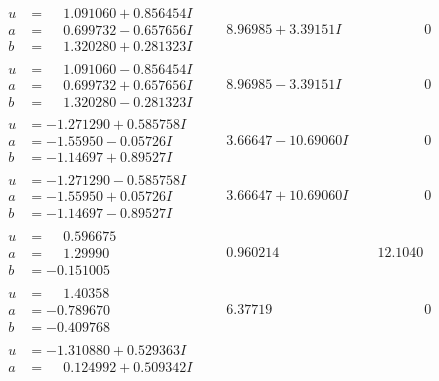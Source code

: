 \documentclass[1p]{elsarticle_modified}
\theoremstyle{definition}
\begin{document}
$$\begin{array}{c|c|c}
\begin{aligned}
u &= \phantom{-}1.091060 + 0.856454 I \\
a &= \phantom{-}0.699732 - 0.657656 I \\
b &= \phantom{-}1.320280 + 0.281323 I\end{aligned}
 & \phantom{-}8.96985 + 3.39151 I & \phantom{-0.000000 } 0 \\ \hline\begin{aligned}
u &= \phantom{-}1.091060 - 0.856454 I \\
a &= \phantom{-}0.699732 + 0.657656 I \\
b &= \phantom{-}1.320280 - 0.281323 I\end{aligned}
 & \phantom{-}8.96985 - 3.39151 I & \phantom{-0.000000 } 0 \\ \hline\begin{aligned}
u &= -1.271290 + 0.585758 I \\
a &= -1.55950 - 0.05726 I \\
b &= -1.14697 + 0.89527 I\end{aligned}
 & \phantom{-}3.66647 - 10.69060 I & \phantom{-0.000000 } 0 \\ \hline\begin{aligned}
u &= -1.271290 - 0.585758 I \\
a &= -1.55950 + 0.05726 I \\
b &= -1.14697 - 0.89527 I\end{aligned}
 & \phantom{-}3.66647 + 10.69060 I & \phantom{-0.000000 } 0 \\ \hline\begin{aligned}
u &= \phantom{-}0.596675\phantom{ +0.000000I} \\
a &= \phantom{-}1.29990\phantom{ +0.000000I} \\
b &= -0.151005\phantom{ +0.000000I}\end{aligned}
 & \phantom{-}0.960214\phantom{ +0.000000I} & \phantom{-}12.1040\phantom{ +0.000000I} \\ \hline\begin{aligned}
u &= \phantom{-}1.40358\phantom{ +0.000000I} \\
a &= -0.789670\phantom{ +0.000000I} \\
b &= -0.409768\phantom{ +0.000000I}\end{aligned}
 & \phantom{-}6.37719\phantom{ +0.000000I} & \phantom{-0.000000 } 0 \\ \hline\begin{aligned}
u &= -1.310880 + 0.529363 I \\
a &= \phantom{-}0.124992 + 0.509342 I \\

\end{aligned}
\end{array}$$
\end{document}
